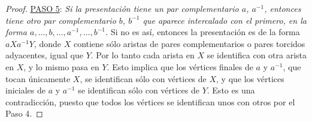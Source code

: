 \documentclass[10pt]{report}
\theoremstyle{definition}
\begin{document}
\begin{proof}
%

\underline{PASO 5}: \textit{Si la presentación tiene un par complementario $a$, $a^{-1}$, entonces tiene otro par complementario $b$,  $b^{-1}$ que aparece intercalado con el primero, en la forma $a,\dots , b, \dots ,a^{-1}, \dots , b^{-1} $.} Si no es así, entonces la presentación es de la forma $aXa^{-1}Y$, donde $X$ contiene sólo aristas de pares complementarios o pares torcidos adyacentes, igual que $Y$. Por lo tanto cada arista en $X$ se identifica con otra arista en $X$, y lo mismo pasa en $Y$. Esto implica que los vértices finales de $a$ y $a^{-1}$, que tocan únicamente $X$, se identifican sólo con vértices de $X$, y que los vértices iniciales de $a$ y $a^{-1}$ se identifican sólo con vértices de $Y$. Esto es una contradicción, puesto que todos los vértices se identifican unos con otros por el Paso 4.


\end{proof}
\end{document}
